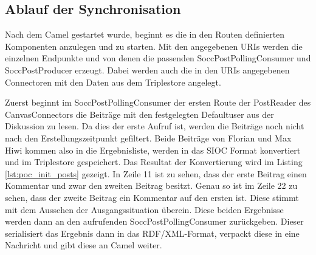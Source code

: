 
\subsection{Ablauf der Synchronisation} %
\label{sub:ablauf_der_synchronisierung}

Nach dem Camel gestartet wurde, beginnt es die in den Routen definierten Komponenten anzulegen und zu starten. Mit den angegebenen URIs werden die einzelnen Endpunkte und von denen die passenden SoccPostPollingConsumer und SoccPostProducer erzeugt. Dabei werden auch die in den URIs angegebenen Connectoren mit den Daten aus dem Triplestore angelegt.

Zuerst beginnt im SoccPostPollingConsumer der ersten Route der PostReader des CanvasConnectors die Beiträge mit den festgelegten Defaultuser aus der Diskussion zu lesen. Da dies der erste Aufruf ist, werden die Beiträge noch nicht nach den Erstellungszeitpunkt gefiltert. Beide Beiträge von Florian und Max Hiwi kommen also in die Ergebnisliste, werden in das SIOC Format konvertiert und im Triplestore gespeichert. Das Resultat der Konvertierung wird im Listing \ref{lst:poc_init_posts} gezeigt. In Zeile 11 ist zu sehen, dass der erste Beitrag einen Kommentar und zwar den zweiten Beitrag besitzt. Genau so ist im Zeile 22 zu sehen, dass der zweite Beitrag ein Kommentar auf den ersten ist. Diese stimmt mit dem Aussehen der Ausgangssituation überein. Diese beiden Ergebnisse werden dann an den aufrufenden SoccPostPollingConsumer zurückgeben. Dieser serialisiert das Ergebnis dann in das RDF/XML-Format, verpackt diese in eine Nachricht und gibt diese an Camel weiter.


